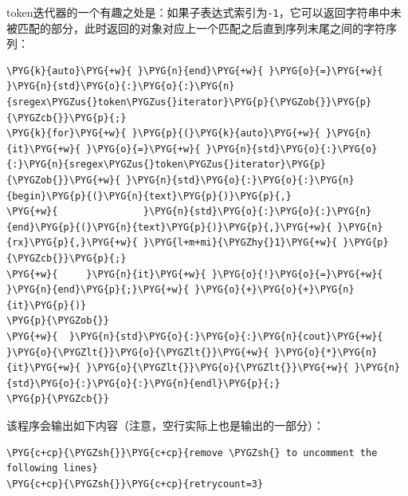 
token迭代器的一个有趣之处是：如果子表达式索引为\texttt{-\allowbreak{}1}，它可以返回字符串中未被匹配的部分，此时返回的对象对应上一个匹配之后直到序列末尾之间的字符序列：



\begin{codeblockbg}
\begin{Verbatim}[commandchars=\\\{\},breaklines=true,breakanywhere=true,fontsize=\codefont,xleftmargin=17bp]
\PYG{k}{auto}\PYG{+w}{ }\PYG{n}{end}\PYG{+w}{ }\PYG{o}{=}\PYG{+w}{ }\PYG{n}{std}\PYG{o}{:}\PYG{o}{:}\PYG{n}{sregex\PYGZus{}token\PYGZus{}iterator}\PYG{p}{\PYGZob{}}\PYG{p}{\PYGZcb{}}\PYG{p}{;}
\PYG{k}{for}\PYG{+w}{ }\PYG{p}{(}\PYG{k}{auto}\PYG{+w}{ }\PYG{n}{it}\PYG{+w}{ }\PYG{o}{=}\PYG{+w}{ }\PYG{n}{std}\PYG{o}{:}\PYG{o}{:}\PYG{n}{sregex\PYGZus{}token\PYGZus{}iterator}\PYG{p}{\PYGZob{}}\PYG{+w}{ }\PYG{n}{std}\PYG{o}{:}\PYG{o}{:}\PYG{n}{begin}\PYG{p}{(}\PYG{n}{text}\PYG{p}{)}\PYG{p}{,}
\PYG{+w}{               }\PYG{n}{std}\PYG{o}{:}\PYG{o}{:}\PYG{n}{end}\PYG{p}{(}\PYG{n}{text}\PYG{p}{)}\PYG{p}{,}\PYG{+w}{ }\PYG{n}{rx}\PYG{p}{,}\PYG{+w}{ }\PYG{l+m+mi}{\PYGZhy{}1}\PYG{+w}{ }\PYG{p}{\PYGZcb{}}\PYG{p}{;}
\PYG{+w}{     }\PYG{n}{it}\PYG{+w}{ }\PYG{o}{!}\PYG{o}{=}\PYG{+w}{ }\PYG{n}{end}\PYG{p}{;}\PYG{+w}{ }\PYG{o}{+}\PYG{o}{+}\PYG{n}{it}\PYG{p}{)}
\PYG{p}{\PYGZob{}}
\PYG{+w}{  }\PYG{n}{std}\PYG{o}{:}\PYG{o}{:}\PYG{n}{cout}\PYG{+w}{ }\PYG{o}{\PYGZlt{}}\PYG{o}{\PYGZlt{}}\PYG{+w}{ }\PYG{o}{*}\PYG{n}{it}\PYG{+w}{ }\PYG{o}{\PYGZlt{}}\PYG{o}{\PYGZlt{}}\PYG{+w}{ }\PYG{n}{std}\PYG{o}{:}\PYG{o}{:}\PYG{n}{endl}\PYG{p}{;}
\PYG{p}{\PYGZcb{}}
\end{Verbatim}
\end{codeblockbg}



该程序会输出如下内容（注意，空行实际上也是输出的一部分）：



\begin{codeblockbg}
\begin{Verbatim}[commandchars=\\\{\},breaklines=true,breakanywhere=true,fontsize=\codefont,xleftmargin=17bp]
\PYG{c+cp}{\PYGZsh{}}\PYG{c+cp}{remove \PYGZsh{} to uncomment the following lines}
\PYG{c+cp}{\PYGZsh{}}\PYG{c+cp}{retrycount=3}
\end{Verbatim}
\end{codeblockbg}


